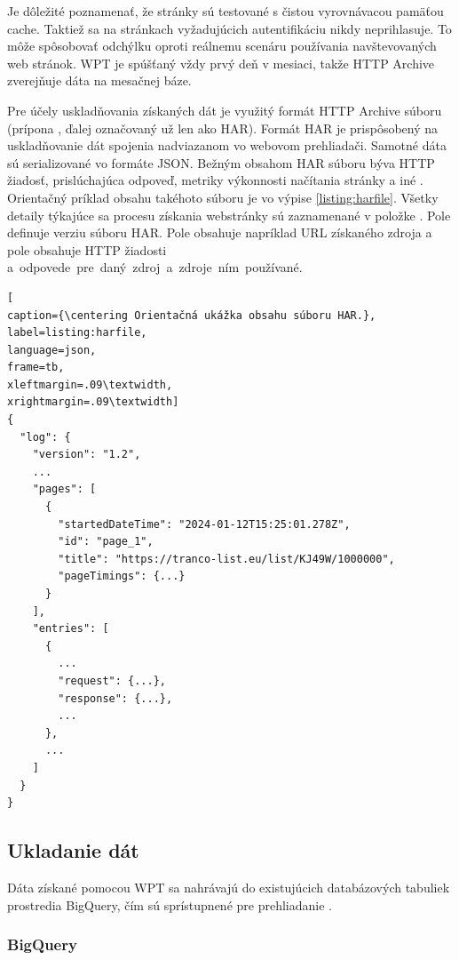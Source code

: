 Je dôležité poznamenať, že stránky sú testované s čistou vyrovnávacou pamäťou cache. 
Taktiež sa na stránkach vyžadujúcich autentifikáciu nikdy neprihlasuje.
To môže spôsobovať odchýlku oproti reálnemu scenáru používania navštevovaných web stránok. 
WPT je spúšťaný vždy prvý deň v mesiaci, takže HTTP Archive zverejňuje dáta na mesačnej báze.

Pre účely uskladňovania získaných dát je využitý formát HTTP Archive súboru (prípona , ďalej označovaný už len ako HAR).
Formát HAR je prispôsobený na uskladňovanie dát spojenia nadviazanom vo webovom prehliadači. Samotné dáta sú serializované vo formáte JSON.
Bežným obsahom HAR súboru býva HTTP žiadosť, prislúchajúca odpoveď, metriky výkonnosti načítania stránky a iné \cite{httparchive-harfile}. 
Orientačný príklad obsahu takéhoto súboru je vo výpise \ref{listing:harfile}.
Všetky detaily týkajúce sa procesu získania webstránky sú zaznamenané v položke . Pole  definuje verziu súboru HAR. Pole  obsahuje napríklad URL získaného zdroja a pole  obsahuje HTTP žiadosti \mbox{a odpovede pre daný zdroj a zdroje ním používané.}

\pagebreak

\begin{center}
\centering
\begin{lstlisting}[
caption={\centering Orientačná ukážka obsahu súboru HAR.},
label=listing:harfile, 
language=json, 
frame=tb,
xleftmargin=.09\textwidth, 
xrightmargin=.09\textwidth]
{
  "log": {
    "version": "1.2",
    ...
    "pages": [
      {
        "startedDateTime": "2024-01-12T15:25:01.278Z",
        "id": "page_1",
        "title": "https://tranco-list.eu/list/KJ49W/1000000",
        "pageTimings": {...}
      }
    ],
    "entries": [
      {
        ...
        "request": {...},
        "response": {...},
        ...
      },
      ...
    ]
  }
}
\end{lstlisting}
\end{center} 

\subsection{Ukladanie dát}

Dáta získané pomocou WPT sa nahrávajú do existujúcich databázových tabuliek prostredia BigQuery, čím sú sprístupnené pre prehliadanie \cite{httparchive-faq}.

\subsubsection{BigQuery}
\label{big-query}

